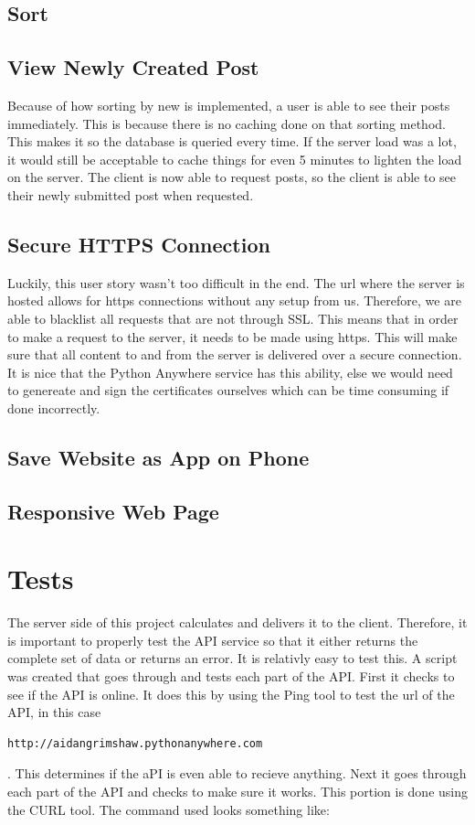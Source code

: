 \documentclass[12pt]{article}
\begin{document}
\subsection{Sort}

\subsection{View Newly Created Post}
Because of how sorting by new is implemented, a user is able to see their posts immediately.  This is because there is no caching done on that sorting method.  This makes it so the database is queried every time.  If the server load was a lot, it would still be acceptable to cache things for even 5 minutes to lighten the load on the server.  The client is now able to request posts, so the client is able to see their newly submitted post when requested.

\subsection{Secure HTTPS Connection}

Luckily, this user story wasn't too difficult in the end.  The url where the server is hosted allows for https connections without any setup from us.  Therefore, we are able to blacklist all requests that are not through SSL.  This means that in order to make a request to the server, it needs to be made using https.  This will make sure that all content to and from the server is delivered over a secure connection.  It is nice that the Python Anywhere service has this ability, else we would need to genereate and sign the certificates ourselves which can be time consuming if done incorrectly.

\subsection{Save Website as App on Phone}

\subsection{Responsive Web Page}

\section{Tests}

The server side of this project calculates and delivers it to the client.
Therefore, it is important to properly test the API service so that it either
returns the complete set of data or returns an error.  It is relativly easy to
test this.  A script was created that goes through and tests each part of the
API.  First it checks to see if the API is online.  It does this by using the
Ping tool to test the url of the API, in this case
\begin{verbatim}http://aidangrimshaw.pythonanywhere.com \end{verbatim}.  This
determines if the aPI is even able to recieve anything.  Next it goes through
each part of the API and checks to make sure it works.  This portion is done
using the CURL tool.  The command used looks something like:
\end{document}

